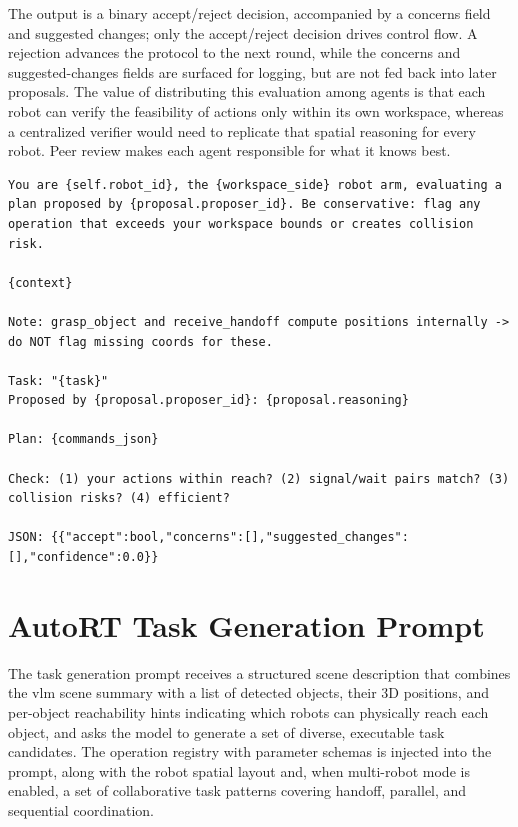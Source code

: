 \documentclass[
     12pt,
     a4paper,
     BCOR=10mm,
     DIV=14,
     listof=totoc,
     bibliography=totoc,
     parskip,
     twoside,
     headsepline
     ]{scrreprt}
\begin{document}
The output is a binary accept/reject decision, accompanied by a concerns field and suggested changes; only the accept/reject decision drives control flow. A rejection advances the protocol to the next round, while the concerns and suggested-changes fields are surfaced for logging, but are not fed back into later proposals. The value of distributing this evaluation among agents is that each robot can verify the feasibility of actions only within its own workspace, whereas a centralized verifier would need to replicate that spatial reasoning for every robot. Peer review makes each agent responsible for what it knows best.

\begin{lstlisting}[caption={Proposal evaluation prompt for decentralized plan validation, workspace constraint verification, and safety checking.}, extendedchars=true]
You are {self.robot_id}, the {workspace_side} robot arm, evaluating a plan proposed by {proposal.proposer_id}. Be conservative: flag any operation that exceeds your workspace bounds or creates collision risk.

{context}

Note: grasp_object and receive_handoff compute positions internally -> do NOT flag missing coords for these.

Task: "{task}"
Proposed by {proposal.proposer_id}: {proposal.reasoning}

Plan: {commands_json}

Check: (1) your actions within reach? (2) signal/wait pairs match? (3) collision risks? (4) efficient?

JSON: {{"accept":bool,"concerns":[],"suggested_changes":[],"confidence":0.0}}
\end{lstlisting}

\section{AutoRT Task Generation Prompt}
The task generation prompt receives a structured scene description that combines the \gls{vlm} scene summary with a list of detected objects, their 3D positions, and per-object reachability hints indicating which robots can physically reach each object, and asks the model to generate a set of diverse, executable task candidates. The operation registry with parameter schemas is injected into the prompt, along with the robot spatial layout and, when multi-robot mode is enabled, a set of collaborative task patterns covering handoff, parallel, and sequential coordination.
\end{document}
